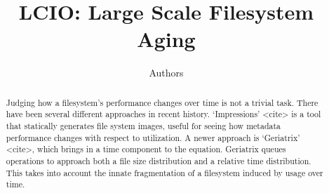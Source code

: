 \documentclass[11pt]{amsart}
\title{LCIO: Large Scale Filesystem Aging}
\author{Authors}
\begin{document}
\maketitle

\begin{abstract}
Judging how a filesystem's performance changes over time is not a trivial task. There have been
several different approaches in recent history. `Impressions' <cite> is a tool that statically
generates file system images, useful for seeing how metadata performance changes with respect to 
utilization. A newer approach is `Geriatrix' <cite>, which brings in a time component to the 
equation. Geriatrix queues operations to approach both a file size distribution and a relative 
time distribution. This takes into account the innate fragmentation of a filesystem induced by 
usage over time. 
\end{abstract}
\end{document}
